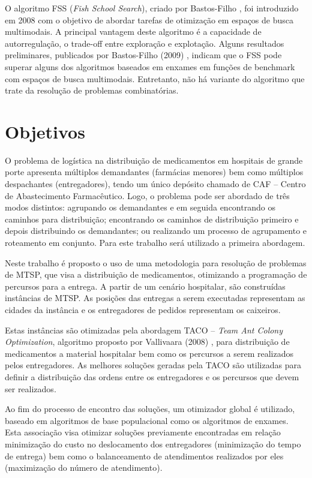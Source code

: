 O algoritmo FSS (\textit{Fish School Search}), criado por Bastos-Filho \cite{bastos2008novel}, foi introduzido em 2008 com o objetivo de abordar tarefas de otimização em espaços de busca multimodais. A principal vantagem deste algoritmo é a capacidade de autorregulação, o trade-off entre exploração e explotação. Alguns resultados preliminares, publicados por Bastos-Filho (2009) \cite{bastos2009fish}, indicam que o FSS pode superar alguns dos algoritmos baseados em enxames em funções de benchmark com espaços de busca multimodais. Entretanto, não há variante do algoritmo que trate da resolução de problemas combinatórias.

\section{Objetivos}
\label{sec-objetivos}

O problema de logística na distribuição de medicamentos em hospitais de grande porte apresenta múltiplos demandantes (farmácias menores) bem como múltiplos despachantes (entregadores), tendo um único depósito chamado de CAF – Centro de Abastecimento Farmacêutico. Logo, o problema pode ser abordado de três modos distintos: agrupando os demandantes e em seguida encontrando os caminhos para distribuição; encontrando os caminhos de distribuição primeiro e depois distribuindo os demandantes; ou realizando um processo de agrupamento e roteamento em conjunto. Para este trabalho será utilizado a primeira abordagem. %

Neste trabalho é proposto o uso de uma metodologia para resolução de problemas de MTSP, que visa a distribuição de medicamentos, otimizando a programação de percursos para a entrega. A partir de um cenário hospitalar, são construídas instâncias de MTSP. As posições das entregas a serem executadas representam as cidades da instância e os entregadores de pedidos representam os caixeiros.

Estas instâncias são otimizadas pela abordagem TACO – \textit{Team Ant Colony Optimization}, algoritmo proposto por Vallivaara (2008) \cite{vallivaara2008team}, para distribuição de medicamentos a material hospitalar bem como os percursos a serem realizados pelos entregadores. As melhores soluções geradas pela TACO são utilizadas para definir a distribuição das ordens entre os entregadores e os percursos que devem ser realizados.

Ao fim do processo de encontro das soluções, um otimizador global é utilizado, baseado em algoritmos de base populacional como os algoritmos de enxames. Esta associação visa otimizar soluções previamente encontradas em relação minimização do custo no deslocamento dos entregadores (minimização do tempo de entrega) bem como o balanceamento de atendimentos realizados por eles (maximização do número de atendimento).

